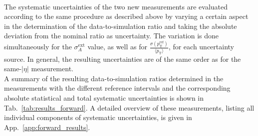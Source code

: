 \\
The systematic uncertainties of the two new measurements are evaluated according to the same procedure as described above by varying a certain aspect in the determination of the data-to-simulation ratio and taking the absolute deviation from the nominal ratio as uncertainty. The variation is done simultaneously for the $\sigma_{A}^\mathrm{ext}$ value, as well as for $\frac{\sigma (p^\mathrm{ref}_\mathrm{T})}{{\langle p_\mathrm{T} \rangle}}$, for each uncertainty source. In general, the resulting uncertainties are of the same order as for the same-$|\eta|$ measurement. \\
A summary of the resulting data-to-simulation ratios determined in the measurements with the different reference intervals and the corresponding absolute statistical and total systematic uncertainties is shown in Tab.~\ref{tab:results_forward}. A detailed overview of these measurements, listing all individual components of systematic uncertainties, is given in App.~\ref{app:forward_results}. 

